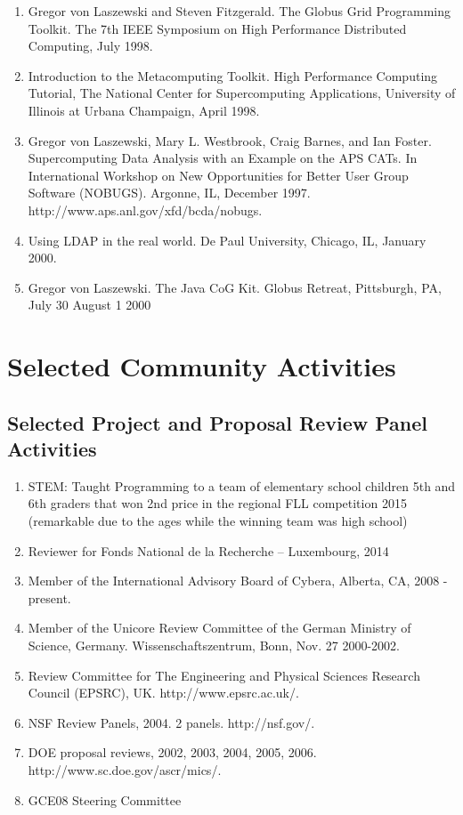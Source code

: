 \documentclass{article}
\begin{document}
\begin{enumerate}
\item  Gregor von Laszewski and Steven Fitzgerald. The Globus Grid Programming Toolkit. The 7th IEEE Symposium on High Performance Distributed Computing, July 1998. 
\item  Introduction to the Metacomputing Toolkit. High Performance Computing Tutorial, The National Center for Supercomputing Applications, University of Illinois at Urbana Champaign, April 1998. 
\item  Gregor von Laszewski, Mary L. Westbrook, Craig Barnes, and Ian Foster. Supercomputing Data Analysis with an Example on the APS CATs. In International Workshop on New Opportunities for Better User Group Software (NOBUGS). Argonne, IL, December 1997. http://www.aps.anl.gov/xfd/bcda/nobugs. 
\item  Using LDAP in the real world. De Paul University, Chicago, IL, January 2000. 
\item  Gregor von Laszewski. The Java CoG Kit. Globus Retreat, Pittsburgh, PA, July 30 August 1 2000 
\end{enumerate}
    
\section{Selected Community Activities}

\subsection{Selected Project and Proposal Review Panel Activities} 

\begin{enumerate}
\item  STEM: Taught Programming to a team of elementary school children 5th and 6th graders that won 2nd price in the regional FLL competition 2015 (remarkable due to the ages while the winning team was high school) 
\item  Reviewer for Fonds National de la Recherche – Luxembourg, 2014 
\item  Member of the International Advisory Board of Cybera, Alberta, CA, 2008 - present.
\item  Member of the Unicore Review Committee of the German Ministry of Science, Germany. Wissenschaftszentrum, Bonn, Nov. 27 2000-2002. 
\item  Review Committee for The Engineering and Physical Sciences Research Council (EPSRC), UK. http://www.epsrc.ac.uk/. 
\item  NSF Review Panels, 2004. 2 panels. http://nsf.gov/. 
\item  DOE proposal reviews, 2002, 2003, 2004, 2005, 2006. http://www.sc.doe.gov/ascr/mics/. 
\item  GCE08 Steering Committee
\end{enumerate}
    
\end{document}
